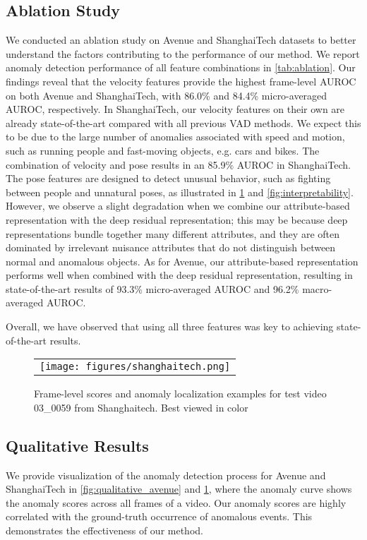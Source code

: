 \documentclass[10pt,twocolumn,letterpaper]{article}
\begin{document}
\subsection{Ablation Study}
\label{exp:ablation_study}
We conducted an ablation study on Avenue and ShanghaiTech datasets to better understand the factors contributing to the performance of our method. We report anomaly detection performance of all feature combinations in \cref{tab:ablation}. Our findings reveal that the velocity features provide the highest frame-level AUROC on both Avenue and ShanghaiTech, with 86.0\% and 84.4\% micro-averaged AUROC, respectively. In ShanghaiTech, our velocity features on their own are already state-of-the-art compared with all previous VAD methods. We expect this to be due to the large number of anomalies associated with speed and motion, such as running people and fast-moving objects, e.g. cars and bikes. The combination of velocity and pose results in an 85.9\% AUROC in ShanghaiTech. The pose features are designed to detect unusual behavior, such as fighting between people and unnatural poses, as illustrated in \cref{fig:qualitative_shanghaitech} and \cref{fig:interpretability}. However, we observe a slight degradation when we combine our attribute-based representation with the deep residual representation; this may be because deep representations bundle together many different attributes, and they are often dominated by irrelevant nuisance attributes that do not distinguish between normal and anomalous objects.
As for Avenue, our attribute-based representation performs well when combined with the deep residual representation, resulting in state-of-the-art results of 93.3\% micro-averaged AUROC and 96.2\% macro-averaged AUROC.

Overall, we have observed that using all three features was key to achieving state-of-the-art results.


\begin{figure}[t]
  \centering
    \begin{tabular}{c}
    \texttt{[image: figures/shanghaitech.png]} 
    \end{tabular}
    \caption{Frame-level scores and anomaly localization examples for test video 03\_0059 from Shanghaitech. Best viewed in color}
    \label{fig:qualitative_shanghaitech}
\end{figure}

\subsection{Qualitative Results} 
We provide visualization of the anomaly detection process for Avenue and ShanghaiTech in \cref{fig:qualitative_avenue} and \cref{fig:qualitative_shanghaitech}, where the anomaly curve shows the anomaly scores across all frames of a video. Our anomaly scores are highly correlated with the ground-truth occurrence of anomalous events. This demonstrates the effectiveness of our method. 
\end{document}
